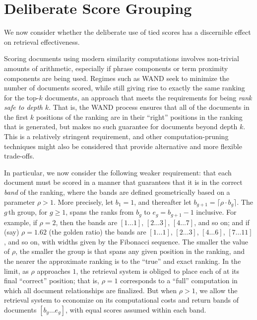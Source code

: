 \section{Deliberate Score Grouping}
\label{sec-roundingoff}

We now consider whether the deliberate use of tied scores
has a discernible effect on retrieval effectiveness.


Scoring documents using modern similarity computations involves
non-trivial amounts of arithmetic, especially if phrase components or
term proximity components are being used.
Regimes such as WAND {\citep{bchsz03cikm}} seek to minimize the
number of documents scored, while still giving rise to exactly the
same ranking for the top-$k$ documents, an approach that meets the
requirements for being {\emph{rank safe to depth $k$}}.
That is, the WAND process ensures that all of the documents in the
first $k$ positions of the ranking are in their ``right'' positions
in the ranking that is generated, but makes no such guarantee for
documents beyond depth $k$.
This is a relatively stringent requirement, and other
computation-pruning techniques might also be considered that provide
alternative and more flexible trade-offs.

In particular, we now consider the following weaker requirement: that
each document must be scored in a manner that guarantees that it is
in the correct {\emph{band}} of the ranking, where the bands are
defined geometrically based on a parameter $\rho>1$.
More precisely, let $b_1=1$, and thereafter let
$b_{g+1}=\lceil{\rho\cdot b_g}\rceil$.
The $g$\,th group, for $g\ge1$, spans the ranks from $b_g$ to
$e_g=b_{g+1}-1$ inclusive.
For example, if $\rho=2$, then the bands are $[1\ldots1]$,
$[2\ldots3]$, $[4\ldots7]$, and so on; and if (say) $\rho=1.62$ (the
golden ratio) the bands are $[1\ldots1]$, $[2\ldots3]$, $[4\ldots6]$,
$[7\ldots11]$, and so on, with widths given by the Fibonacci
sequence.
The smaller the value of $\rho$, the smaller the group is that spans
any given position in the ranking, and the nearer the approximate
ranking is to the ``true'' and exact ranking.
In the limit, as $\rho$ approaches $1$, the retrieval system is
obliged to place each of at its final ``correct'' position; that is,
$\rho=1$ corresponds to a ``full'' computation in which all document
relationships are finalized.
But when $\rho>1$, we allow the retrieval system to economize on its
computational costs and return bands of documents $[b_g\ldots e_g]$,
with equal scores assumed within each band.

